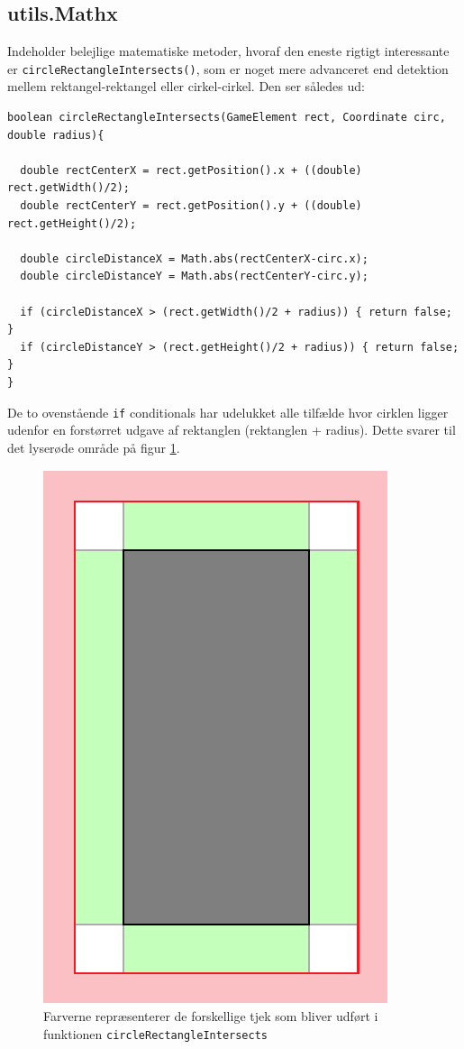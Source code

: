 \documentclass[titlepage,danish]{article}
\newcommand{\code}[1]{\texttt{#1}}
\begin{document}
\subsection{utils.Mathx}
Indeholder belejlige matematiske metoder, hvoraf den eneste rigtigt interessante er
\code{circleRectangleIntersects()}, som er noget mere advanceret end detektion mellem
rektangel-rektangel eller cirkel-cirkel. Den ser således ud:

\begin{verbatim}
boolean circleRectangleIntersects(GameElement rect, Coordinate circ, double radius){

  double rectCenterX = rect.getPosition().x + ((double) rect.getWidth()/2);
  double rectCenterY = rect.getPosition().y + ((double) rect.getHeight()/2);

  double circleDistanceX = Math.abs(rectCenterX-circ.x);
  double circleDistanceY = Math.abs(rectCenterY-circ.y);

  if (circleDistanceX > (rect.getWidth()/2 + radius)) { return false; }
  if (circleDistanceY > (rect.getHeight()/2 + radius)) { return false; }
}
\end{verbatim}

De to ovenstående \code{if} conditionals har udelukket alle tilfælde hvor cirklen ligger udenfor en
forstørret udgave af rektanglen (rektanglen + radius). Dette svarer til det lyserøde område på
figur \ref{fig:col_rect}.

\begin{figure}[h!]
  \centering
  \includegraphics[scale=0.60]{rekt_cirk_02.eps}
  \caption{Farverne repræsenterer de forskellige tjek som bliver udført i funktionen \code{circleRectangleIntersects}}
  \label{fig:col_rect}
\end{figure}
\end{document}
